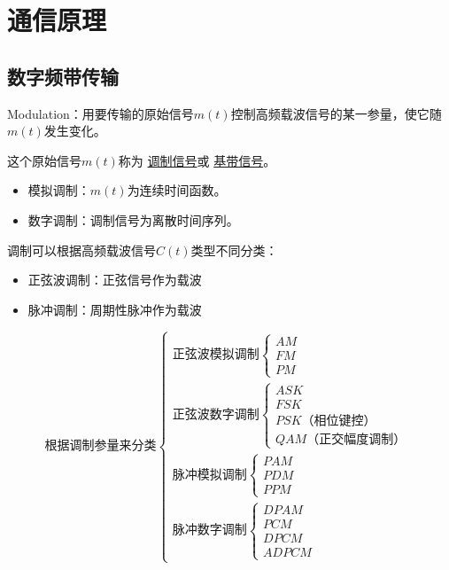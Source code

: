 \chapter{通信原理}

\section{数字频带传输}
        Modulation：用要传输的原始信号$m(t)$控制高频载波信号的某一参量，使它随$m(t)$发生变化。

        这个原始信号$m(t)$称为 \underline{调制信号}或 \underline{基带信号}。
        \begin{itemize}
            \item 模拟调制：$m(t)$为连续时间函数。
            \item 数字调制：调制信号为离散时间序列。
        \end{itemize}

        调制可以根据高频载波信号$C(t)$类型不同分类：
        \begin{itemize}
            \item 正弦波调制：正弦信号作为载波
            \item 脉冲调制：周期性脉冲作为载波
        \end{itemize}

        
        \begin{equation*}
        \mbox{根据调制参量来分类}
        \begin{cases}
            \mbox{正弦波模拟调制}\begin{cases}
                AM\\FM\\PM
            \end{cases}\\
            \mbox{正弦波数字调制}\begin{cases}
                ASK\\FSK\\PSK（相位键控）\\QAM（正交幅度调制）
            \end{cases}\\
            \mbox{脉冲模拟调制}\begin{cases}
                PAM\\PDM\\PPM
            \end{cases}\\
            \mbox{脉冲数字调制}\begin{cases}
                DPAM\\PCM\\DPCM\\ADPCM
            \end{cases}
        \end{cases}
        \end{equation*}


